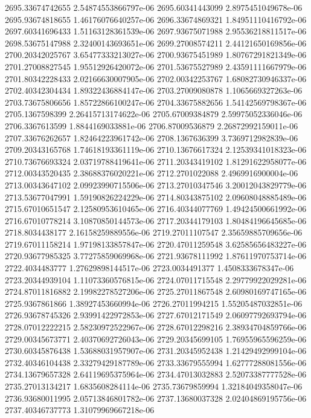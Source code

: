 {2695.33674742655 2.54874553866797e-06
2695.60341443099 2.8975451049678e-06
2695.93674818655 1.46176076640257e-06
2696.33674869321 1.84951110416792e-06
2697.60341696433 1.51163128361539e-06
2697.93675071988 2.95536218811517e-06
2698.53675147988 2.32400143693651e-06
2699.27008574211 2.44121650169856e-06
2700.20342025767 3.65477333213027e-06
2700.93675451989 1.80767291821349e-06
2701.27008827545 1.95512926420072e-06
2701.53675527989 2.43591111667979e-06
2701.80342228433 2.02166630007905e-06
2702.00342253767 1.68082730946337e-06
2702.40342304434 1.89322436884147e-06
2703.27009080878 1.1065669327263e-06
2703.73675806656 1.85722866100247e-06
2704.33675882656 1.54142569798367e-06
2705.1367598399 2.26415713174622e-06
2705.67009384879 2.59975052336046e-06
2706.3367613599 1.8844169033881e-06
2706.87009536879 2.26872992159011e-06
2707.33676262657 1.82464223961742e-06
2708.1367636399 3.7369712982839e-06
2709.20343165768 1.74618193361119e-06
2710.13676617324 2.12539341018323e-06
2710.73676693324 2.03719788419641e-06
2711.20343419102 1.81291622958077e-06
2712.00343520435 2.38688376020221e-06
2712.2701022088 2.4969916900004e-06
2713.00343647102 2.09923990715506e-06
2713.27010347546 3.20012043829779e-06
2713.53677047991 1.59190826224229e-06
2714.80343875102 2.09608048885489e-06
2715.67010651547 2.12580953610465e-06
2716.40344077769 1.49424500661992e-06
2716.67010778214 3.10870850144573e-06
2717.20344179103 1.80484196645685e-06
2718.8034438177 2.16158259889556e-06
2719.27011107547 2.35659885709656e-06
2719.67011158214 1.97198133857847e-06
2720.47011259548 3.62585656483227e-06
2720.93677985325 3.77275859069968e-06
2721.93678111992 1.87611970753714e-06
2722.4034483777 1.27629898144517e-06
2723.0034491377 1.4508333678347e-06
2723.20344939104 1.11073360576815e-06
2724.07011715548 2.29779922029281e-06
2724.87011816882 2.19982278527206e-06
2725.27011867548 2.60980169747165e-06
2725.9367861866 1.38927453660994e-06
2726.27011994215 1.55205487032851e-06
2726.93678745326 2.93991422972853e-06
2727.67012171549 2.06097792693794e-06
2728.07012222215 2.58230972522967e-06
2728.67012298216 2.38934704859766e-06
2729.00345673771 2.40370692726043e-06
2729.20345699105 1.76955965596259e-06
2730.60345876438 1.53688031957907e-06
2731.20345952438 1.21429492999104e-06
2732.40346104438 2.33279429187789e-06
2733.33679555994 1.62777288081556e-06
2734.13679657328 2.64119695375964e-06
2734.47013032883 2.52073387777528e-06
2735.27013134217 1.6835608284114e-06
2735.73679859994 1.32184049358047e-06
2736.93680011995 2.05713846801782e-06
2737.13680037328 2.02404869195756e-06
2737.40346737773 1.31079969667218e-06
}
